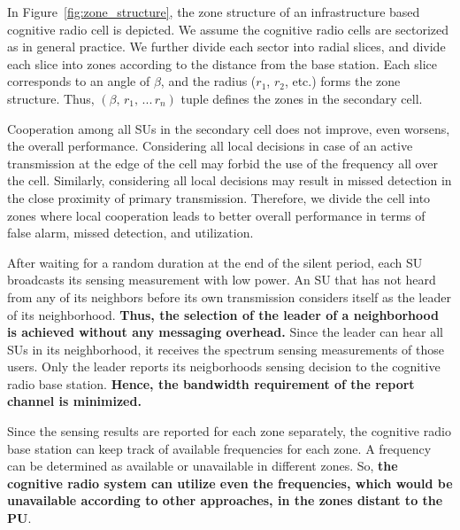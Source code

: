 \documentclass[conference,compsoc]{IEEEtran}
\newcommand{\CR}{cognitive radio }
\begin{document}
In Figure~\ref{fig:zone_structure}, the zone structure of an infrastructure based \CR cell is depicted. We assume the \CR cells are sectorized as in general practice. We further divide each sector into radial slices, and divide each slice into zones according to the distance from the base station. Each slice corresponds to an angle of $\beta$, and the radius ($r_1$, $r_2$, etc.) forms the zone structure. Thus, $(\beta, \, r_1, \, ... \, r_n)$ tuple defines the zones in the secondary cell.

Cooperation among all SUs in the secondary cell does not improve, even worsens, the overall performance. Considering all local decisions in case of an active transmission at the edge of the cell may forbid the use of the frequency all over the cell. Similarly, considering all local decisions may result in missed detection in the close proximity of primary transmission. Therefore, we divide the cell into zones where local cooperation leads to better overall performance in terms of false alarm, missed detection, and utilization.

After waiting for a random duration at the end of the silent period, each SU broadcasts its sensing measurement with low power. An SU that has not heard from any of its neighbors before its own transmission considers itself as the leader of its neighborhood. \textbf{Thus, the selection of the leader of a neighborhood is achieved without any messaging overhead.} Since the leader can hear all SUs in its neighborhood, it receives the spectrum sensing measurements of those users. Only the leader reports its neigborhoods sensing decision to the \CR base station. \textbf{Hence, the bandwidth requirement of the report channel is minimized.}

Since the sensing results are reported for each zone separately, the \CR base station can keep track of available frequencies for each zone. A frequency can be determined as available or unavailable in different zones. So, \textbf{the \CR system can utilize even the frequencies, which would be unavailable according to other approaches, in the zones distant to the PU}.
\end{document}
